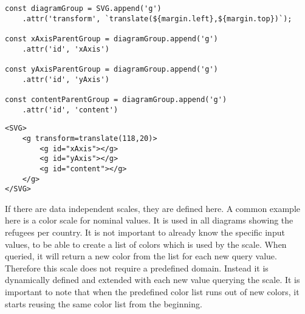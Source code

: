 \begin{minipage}{0.9\linewidth}
\begin{lstlisting}[style=htmlCSSjs, captionpos=b, caption={JavaScript code to create the hierarchy as used in the bar chart. The first line adds a new group element to the main SVG container using the \texttt{append} command. The newly added group element is saved in a constant for later references. Furthermore in line two an attribute is added to the new group element using the \texttt{attr} command and method chaining. It moves the group element from the left and top to allign with the margin definition. In each of the lines four, seven and ten, another group element is added. They are added to the previously created group element. They are all stored in constants for later reference and are provided with ID's for easier identification and debugging.}, label={lst:hierarchy_creation}]
const diagramGroup = SVG.append('g')
    .attr('transform', `translate(${margin.left},${margin.top})`);

const xAxisParentGroup = diagramGroup.append('g')
    .attr('id', 'xAxis')

const yAxisParentGroup = diagramGroup.append('g')
    .attr('id', 'yAxis')

const contentParentGroup = diagramGroup.append('g')
    .attr('id', 'content')
\end{lstlisting}
\begin{lstlisting}[style=htmlCSSjs, captionpos=b, caption={The HTML structure which results from the JavaScript code in listing \ref{lst:hierarchy_creation}. The resulting tree structure clearly separates the different aspects of the diagram. Using a hierarchical approach makes not only later selections easier, but also increases human readability and simplifies debugging.}, label={lst:hierarchy_result}]
<SVG>
    <g transform=translate(118,20)>
        <g id="xAxis"></g>
        <g id="yAxis"></g>
        <g id="content"></g>
    </g>
</SVG>
    \end{lstlisting}
\end{minipage}


If there are data independent scales, they are defined here. A common example here is a color scale for nominal values. It is used in all diagrams showing the refugees per country. It is not important to already know the specific input values, to be able to create a list of colors which is used by the scale. When queried, it will return a new color from the list for each new query value. Therefore this scale does not require a predefined domain. Instead it is dynamically defined and extended with each new value querying the scale. It is important to note that when the predefined color list runs out of new colors, it starts reusing the same color list from the beginning.

